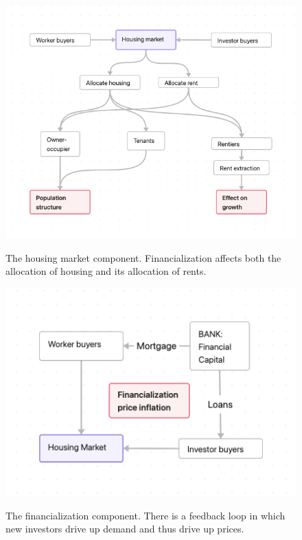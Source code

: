 \begin{figure}[!ht]
    \centering
    \includegraphics[scale=.60]{fig/flow_impacts.png}
    \label{fig-impacts}
\caption[The housing market component of the model.]{The housing market component. Financialization affects both the allocation of housing and its allocation of rents.}
\end{figure}


\begin{figure}[!ht]
    \centering
    \includegraphics[scale=.70]{fig/flow_financialization.png}
    \label{fig-financial-cycle}
    \caption[The financialization component of the model.]{The financialization component. There is a feedback loop in which new investors drive up demand and thus drive up prices.}
\end{figure}

